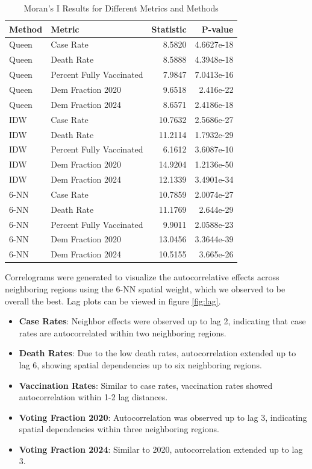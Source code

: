 \documentclass[10pt,journal,compsoc]{IEEEtran}
\begin{document}
\begin{table}[h]
    \centering
    \begin{tabular}{|l|l|r|r|}
        \hline
        \textbf{Method} & \textbf{Metric} & \textbf{Statistic} & \textbf{P-value} \\
        \hline
        Queen & Case Rate & 8.5820 & 4.6627e-18 \\
        Queen & Death Rate & 8.5888 & 4.3948e-18 \\
        Queen & Percent Fully Vaccinated & 7.9847 & 7.0413e-16 \\
        Queen & Dem Fraction 2020 & 9.6518 & 2.416e-22 \\
        Queen & Dem Fraction 2024 & 8.6571 & 2.4186e-18 \\
        IDW & Case Rate & 10.7632 & 2.5686e-27 \\
        IDW & Death Rate & 11.2114 & 1.7932e-29 \\
        IDW & Percent Fully Vaccinated & 6.1612 & 3.6087e-10 \\
        IDW & Dem Fraction 2020 & 14.9204 & 1.2136e-50 \\
        IDW & Dem Fraction 2024 & 12.1339 & 3.4901e-34 \\
        6-NN & Case Rate & 10.7859 & 2.0074e-27 \\
        6-NN & Death Rate & 11.1769 & 2.644e-29 \\
        6-NN & Percent Fully Vaccinated & 9.9011 & 2.0588e-23 \\
        6-NN & Dem Fraction 2020 & 13.0456 & 3.3644e-39 \\
        6-NN & Dem Fraction 2024 & 10.5155 & 3.665e-26 \\
        \hline
    \end{tabular}
    \caption{\centering Moran's I Results for Different Metrics and Methods}
    \label{tab:moran_results}
\end{table}

Correlograms were generated to visualize the autocorrelative effects across neighboring regions using the 6-NN spatial weight, which we observed to be overall the best. Lag plots can be viewed in figure \ref{fig:lag}.

\begin{itemize}
    \item \textbf{Case Rates}: Neighbor effects were observed up to lag 2, indicating that case rates are autocorrelated within two neighboring regions.
    \item \textbf{Death Rates}: Due to the low death rates, autocorrelation extended up to lag 6, showing spatial dependencies up to six neighboring regions.
    \item \textbf{Vaccination Rates}: Similar to case rates, vaccination rates showed autocorrelation within 1-2 lag distances.
    \item \textbf{Voting Fraction 2020}: Autocorrelation was observed up to lag 3, indicating spatial dependencies within three neighboring regions.
    \item \textbf{Voting Fraction 2024}: Similar to 2020, autocorrelation extended up to lag 3.
\end{itemize}
\end{document}
